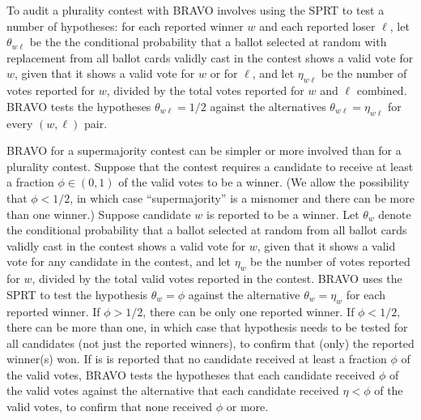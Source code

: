 \documentclass[12pt,runningheads]{llncs}
\begin{document}
{To audit a plurality contest with BRAVO involves using the SPRT to test a number of hypotheses:
for each reported winner $w$ and each reported loser $\ell$, let $\theta_{w\ell}$ be the 
the conditional probability that a ballot selected at random with replacement
from all ballot cards validly cast in the contest shows a valid vote for $w$, given that it shows a valid vote for $w$ or for $\ell$,
and let $\eta_{w\ell}$ be the number of votes reported for $w$, divided by the total votes reported for $w$ and $\ell$ combined.
BRAVO tests the hypotheses $\theta_{w\ell} = 1/2$ against the alternatives $\theta_{w\ell} = \eta_{w\ell}$ for every $(w, \ell)$
pair.

BRAVO for a supermajority contest can be simpler or more involved than for a plurality contest. 
Suppose that the contest requires a candidate to receive at least a fraction $\phi \in (0, 1)$ of the valid votes
to be a winner.
(We allow the possibility that $\phi < 1/2$, in which case ``supermajority'' is a misnomer and there can be more than one winner.)
Suppose candidate $w$ is reported to be a winner.
Let $\theta_w$ denote the conditional probability that a ballot selected
at random from all ballot cards validly cast in the contest shows a valid vote for $w$, given that it shows a valid 
vote for any candidate in the contest,
and let $\eta_w$ be the number of votes reported for $w$, divided by the total valid votes reported in the contest.
BRAVO uses the SPRT to test the hypothesis $\theta_w = \phi$ against the alternative $\theta_w = \eta_w$
for each reported winner. 
If $\phi > 1/2$, there can be only one reported winner. 
If $\phi < 1/2$, there can be more than one, in which case
that hypothesis needs to be tested for all candidates (not just the reported winners), to confirm that (only) the
reported winner(s) won.
If is is reported that no candidate received at least a fraction $\phi$ of the valid votes,  
BRAVO tests the hypotheses that each candidate received $\phi$ of the valid votes
against the alternative that each candidate received $\eta < \phi$ of the valid votes,
to confirm that none received $\phi$ or more.

}
\end{document}
